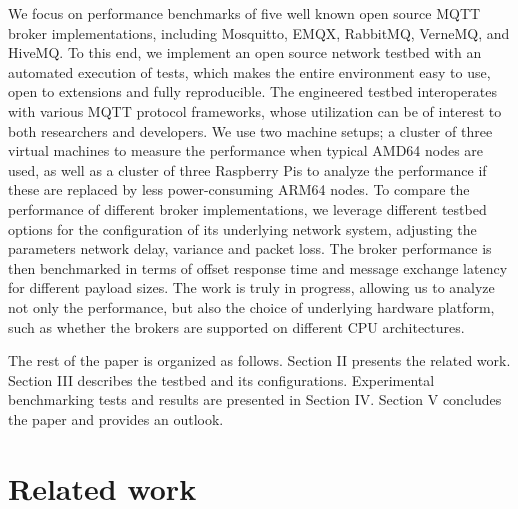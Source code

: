 \documentclass[conference]{IEEEtran}
\begin{document}
We focus on performance benchmarks of five well known open source MQTT broker implementations, including Mosquitto, EMQX, RabbitMQ, VerneMQ, and
HiveMQ. To this end, we implement an open source network testbed with an automated execution of tests, which makes the entire environment easy to use, open to extensions and fully reproducible. The engineered testbed
interoperates with various MQTT protocol frameworks, whose utilization can be of interest to
both researchers and developers. We use two machine setups; a cluster of three virtual machines to measure the
performance when typical AMD64 nodes are used, as well as a cluster of three Raspberry Pis to
analyze the performance if these are replaced by less power-consuming ARM64 nodes.  To compare the performance of different broker implementations, we
leverage different testbed options for the configuration of its underlying network system, adjusting the parameters network delay, variance and packet loss. The broker performance is then benchmarked in terms of offset response time and message exchange latency for different payload sizes. The work is truly in progress, allowing us to analyze not only the performance, but also the choice of underlying hardware platform, such as whether the brokers are supported on different CPU architectures.

The rest of the paper is organized as follows. Section II presents the related work. Section III
describes the testbed and its configurations. Experimental benchmarking tests and results are presented
in Section IV. Section V concludes the paper and provides an outlook.


\section{Related work}
\end{document}
